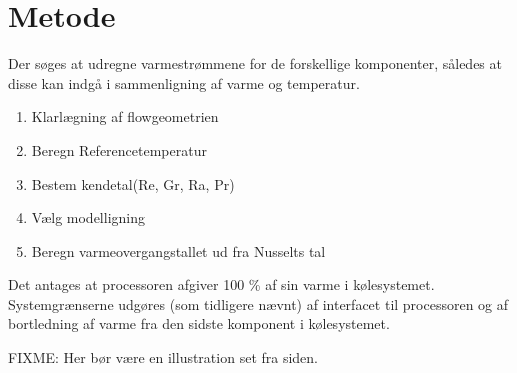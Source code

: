 \section{Metode}

Der søges at udregne varmestrømmene for de forskellige komponenter, således at disse kan indgå i sammenligning af varme og temperatur.

\begin{enumerate}
	\item Klarlægning af flowgeometrien
	\item Beregn Referencetemperatur
	\item Bestem kendetal(Re, Gr, Ra, Pr)
	\item Vælg modelligning
	\item Beregn varmeovergangstallet ud fra Nusselts tal
\end{enumerate}

Det antages at processoren afgiver 100 \% af sin varme i kølesystemet.
Systemgrænserne udgøres (som tidligere nævnt) af interfacet til processoren og af bortledning af varme fra den sidste komponent i kølesystemet.

FIXME: Her bør være en illustration set fra siden.